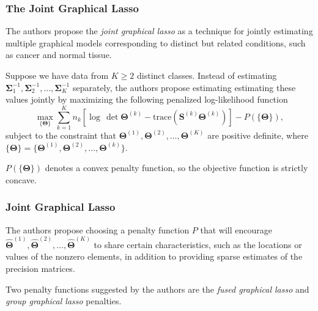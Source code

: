 \documentclass[t]{beamer}
\begin{document}
\begin{frame}
\frametitle{The Joint Graphical Lasso}
The authors propose the \textit{joint graphical lasso} as a technique for jointly estimating multiple graphical models corresponding to distinct but related conditions, such as cancer and normal tissue.

\bigskip
\pause
Suppose we have data from $K \geq 2$ distinct classes.  Instead of estimating $\bm{\Sigma}_{1}^{-1},\bm{\Sigma}_{2}^{-1},\ldots,\bm{\Sigma}_{K}^{-1}$ separately, the authors propose estimating estimating these values jointly by maximizing the following penalized log-likelihood function
\small
\begin{equation*}
\max_{\{\bm{\Theta}\}} \sum_{k=1}^{K}n_{k}\left[\log\,\det \bm{\Theta}^{(k)}-\mbox{trace}\left(\bm{S}^{(k)}\bm{\Theta}^{(k)}\right)\right] - P(\{\bm{\Theta}\}),
\end{equation*}
\normalsize
subject to the constraint that $\bm{\Theta}^{(1)},\bm{\Theta}^{(2)},\ldots,\bm{\Theta}^{(K)}$ are positive definite, where $\{\bm{\Theta}\} = \{\bm{\Theta}^{(1)},\bm{\Theta}^{(2)},\ldots,\bm{\Theta}^{(k)}\}$.

\bigskip
\pause
$P(\{\bm{\Theta}\})$ denotes a convex penalty function, so the objective function is strictly concave.
\end{frame}

\begin{frame}
\frametitle{Joint Graphical Lasso}
The authors propose choosing a penalty function $P$ that will encourage $\hat{\bm{\Theta}}^{(1)},\hat{\bm{\Theta}}^{(2)},\ldots,\hat{\bm{\Theta}}^{(K)}$ to share certain characteristics, such as the locations or values of the nonzero elements, in addition to providing sparse estimates of the precision matrices.

\bigskip
\pause
Two penalty functions suggested by the authors are the \textit{fused graphical lasso} and \textit{group graphical lasso} penalties.
\end{frame}
\end{document}
